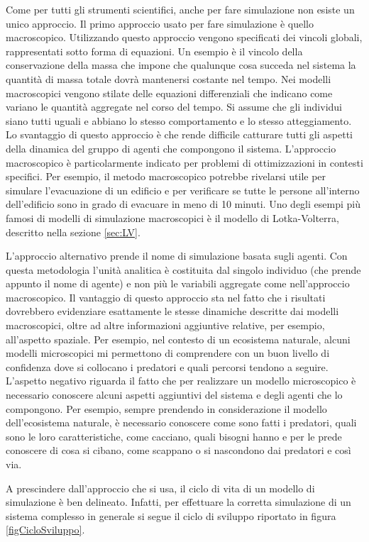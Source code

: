 \documentclass[11pt]{article}
\begin{document}
Come per tutti gli strumenti scientifici, anche per fare simulazione non esiste un unico approccio. Il primo approccio usato per fare simulazione è quello macroscopico. Utilizzando questo approccio vengono specificati dei vincoli globali, rappresentati sotto forma di equazioni. Un esempio è il vincolo della conservazione della massa che impone che qualunque cosa succeda nel sistema la quantità di massa totale dovrà mantenersi costante nel tempo. Nei modelli macroscopici vengono stilate delle equazioni differenziali che indicano come variano le quantità aggregate nel corso del tempo. Si assume che gli individui siano tutti uguali e abbiano lo stesso comportamento e lo stesso atteggiamento. Lo svantaggio di questo approccio è che rende difficile catturare tutti gli aspetti della dinamica del gruppo di agenti che compongono il sistema. L'approccio macroscopico è particolarmente indicato per problemi di ottimizzazioni in contesti specifici. Per esempio, il metodo macroscopico potrebbe rivelarsi utile per simulare l'evacuazione di un edificio e per verificare se tutte le persone all'interno dell'edificio sono in grado di evacuare in meno di 10 minuti.
Uno degli esempi più famosi di modelli di simulazione macroscopici è il modello di Lotka-Volterra, descritto nella sezione \ref{sec:LV}. 

L'approccio alternativo prende il nome di simulazione basata sugli agenti. Con questa metodologia l'unità analitica è costituita dal singolo individuo (che prende appunto il nome di agente) e non più le variabili aggregate come nell'approccio macroscopico. Il vantaggio di questo approccio sta nel fatto che i risultati dovrebbero evidenziare esattamente le stesse dinamiche descritte dai modelli macroscopici, oltre ad altre informazioni aggiuntive relative, per esempio, all'aspetto spaziale. Per esempio, nel contesto di un ecosistema naturale, alcuni modelli microscopici mi permettono di comprendere con un buon livello di confidenza dove si collocano i predatori e quali percorsi tendono a seguire. L'aspetto negativo riguarda il fatto che per realizzare un modello microscopico è necessario conoscere alcuni aspetti aggiuntivi del sistema e degli agenti che lo compongono. Per esempio, sempre prendendo in considerazione il modello dell'ecosistema naturale, è necessario conoscere come sono fatti i predatori, quali sono le loro caratteristiche, come cacciano, quali bisogni hanno e per le prede conoscere di cosa si cibano, come scappano o si nascondono dai predatori e così via. 

A prescindere dall'approccio che si usa, il ciclo di vita di un modello di simulazione è ben delineato. Infatti, per effettuare la corretta simulazione di un sistema complesso in generale si segue il ciclo di sviluppo riportato in figura \ref{figCicloSviluppo}.
\end{document}
